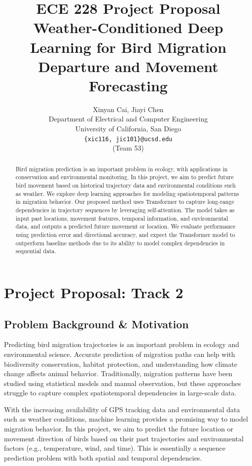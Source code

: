 \documentclass{article}
\title{ECE 228 Project Proposal\\ Weather-Conditioned Deep Learning for Bird Migration Departure and Movement Forecasting}
\author{%
 Xinyan Cai, Jiayi Chen \\
  Department of Electrical and Computer Engineering\\
  University of California, San Diego\\
  \texttt{\{xic116, jic101\}@ucsd.edu} \\
  (Team 53)
}
\begin{document}
\maketitle


\begin{abstract}
Bird migration prediction is an important problem in ecology, with applications in conservation and environmental monitoring. In this project, we aim to predict future bird movement based on historical trajectory data and environmental conditions such as weather. We explore deep learning approaches for modeling spatiotemporal patterns in migration behavior. Our proposed method uses Transformer to capture long-range dependencies in trajectory sequences by leveraging self-attention. The model takes as input past locations, movement features, temporal information, and environmental data, and outputs a predicted future movement or location. We evaluate performance using prediction error and directional accuracy, and expect the Transformer model to outperform baseline methods due to its ability to model complex dependencies in sequential data.
\end{abstract}

\section{Project Proposal: Track 2}

\subsection{Problem Background \& Motivation}

Predicting bird migration trajectories is an important problem in ecology and environmental science. Accurate prediction of migration paths can help with biodiversity conservation, habitat protection, and understanding how climate change affects animal behavior. Traditionally, migration patterns have been studied using statistical models and manual observation, but these approaches struggle to capture complex spatiotemporal dependencies in large-scale data.

With the increasing availability of GPS tracking data and environmental data such as weather conditions, machine learning provides a promising way to model migration behavior. In this project, we aim to predict the future location or movement direction of birds based on their past trajectories and environmental factors (e.g., temperature, wind, and time). This is essentially a sequence prediction problem with both spatial and temporal dependencies.
\end{document}
